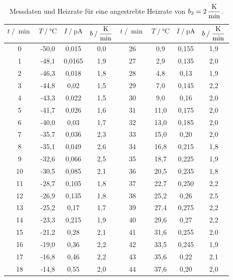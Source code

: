     \begin{table}[H]
        \centering
        \caption{Messdaten und Heizrate für eine angestrebte Heizrate von $ b_2 = 2 \, \unit{\dfrac{\kelvin}{\minute}}$.}
        \label{tab:Messdaten1}
        \begin{tabular}{c c c c c c c c}
        \toprule
         $t \mathbin{/} \unit{\min}$ & $T \mathbin{/} \unit{\celsius}$ & $I \mathbin{/} \unit{\pico\ampere} $&  $b \mathbin{/} \unit{\dfrac{\kelvin}{\minute}}$ & $t \mathbin{/} \unit{\min}$ & $T \mathbin{/} \unit{\celsius}$ & $I \mathbin{/} \unit{\pico\ampere} $&  $b \mathbin{/} \unit{\dfrac{\kelvin}{\minute}}$\\
        \midrule
        0   &-50,0   &0,015   & 0,0&26  &0,9    & 0,155 & 1,9 \\
        1   &-48,1   &0,0165  & 1,9&27  &2,9    & 0,135 & 2,0 \\
        2   &-46,3   &0,018   & 1,8&28  &4,8    & 0,13  & 1,9\\
        3   &-44,8   &0,02    & 1,5&29  &7,0    & 0,145 & 2,2 \\
        4   &-43,3   &0,022   & 1,5&30  &9,0    & 0,16  & 2,0\\
        5   &-41,7   &0,026   & 1,6&31  &11,0   & 0,175 & 2,0 \\
        6   &-40,0   &0,03    & 1,7&32  &13,0   & 0,185 & 2,0 \\
        7   &-35,7   &0,036   & 2,3&33  &15,0   & 0,20  & 2,0\\
        8   &-35,1   &0,049   & 2,6&34  &16,8   & 0,215 & 1,8 \\
        9   &-32,6   &0,066   & 2,5&35  &18,7   & 0,225 & 1,9 \\
        10  &-30,5   &0,085   & 2,1&36  &20,5   & 0,235 & 1,8 \\
        11  &-28,7   &0,105   & 1,8&37  &22,7   & 0,250 & 2,2 \\
        12  &-26,9   &0,135   & 1,8&38  &25,2   & 0,26  & 2,5\\
        13  &-25,2   &0,17    & 1,7&39  &27,4   & 0,275 & 2,2 \\
        14  &-23,3   &0,215   & 1,9&40  &29,6   & 0,27  & 2,2\\
        15  &-21,2   &0,28    & 2,1&41  &31,6   & 0,255 & 2,0 \\
        16  &-19,0   &0,36    & 2,2&42  &33,5   & 0,245 & 1,9 \\
        17  &-16,8   &0,46    & 2,2&43  &35,6   & 0,22  & 2,1\\
        18  &-14,8   &0,55    & 2,0&44  &37,6   & 0,20  & 2,0\\

\end{tabular}
\end{table}
